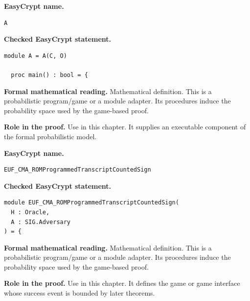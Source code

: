 \begin{formaldefinition}
\noindent\textbf{EasyCrypt name.}
\begin{lstlisting}[language=EasyCrypt,basicstyle=\ttfamily\scriptsize]
A
\end{lstlisting}
\noindent\textbf{Checked EasyCrypt statement.}
\begin{lstlisting}[language=EasyCrypt,basicstyle=\ttfamily\scriptsize]
module A = A(C, O)

  proc main() : bool = {
\end{lstlisting}
\noindent\textbf{Formal mathematical reading.}
Mathematical definition. This is a probabilistic program/game or a module adapter.  Its procedures induce the probability space used by the game-based proof.

\noindent\textbf{Role in the proof.}
Use in this chapter. It supplies an executable component of the formal probabilistic model.

\end{formaldefinition}

\begin{formaldefinition}
\noindent\textbf{EasyCrypt name.}
\begin{lstlisting}[language=EasyCrypt,basicstyle=\ttfamily\scriptsize]
EUF_CMA_ROMProgrammedTranscriptCountedSign
\end{lstlisting}
\noindent\textbf{Checked EasyCrypt statement.}
\begin{lstlisting}[language=EasyCrypt,basicstyle=\ttfamily\scriptsize]
module EUF_CMA_ROMProgrammedTranscriptCountedSign(
  H : Oracle,
  A : SIG.Adversary
) = {
\end{lstlisting}
\noindent\textbf{Formal mathematical reading.}
Mathematical definition. This is a probabilistic program/game or a module adapter.  Its procedures induce the probability space used by the game-based proof.

\noindent\textbf{Role in the proof.}
Use in this chapter. It defines the game or game interface whose success event is bounded by later theorems.

\end{formaldefinition}

